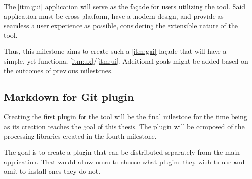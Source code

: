 The \ref{itm:gui} application will serve as the façade for users utilizing the tool. Said application must be cross-platform, have a modern design, and provide as seamless a user experience as possible, considering the extensible nature of the tool.

Thus, this milestone aims to create such a \ref{itm:gui} façade that will have a simple, yet functional \ref{itm:ux}/\ref{itm:ui}. Additional goals might be added based on the outcomes of previous milestones.

\subsection*{Markdown for Git plugin} \label{subSecMdGitPlugin}

Creating the first plugin for the tool will be the final milestone for the time being as its creation reaches the goal of this thesis.
The plugin will be composed of the processing libraries created in the fourth milestone.

The goal is to create a plugin that can be distributed separately from the main application. That would allow users to choose what plugins they wish to use and omit to install ones they do not.
